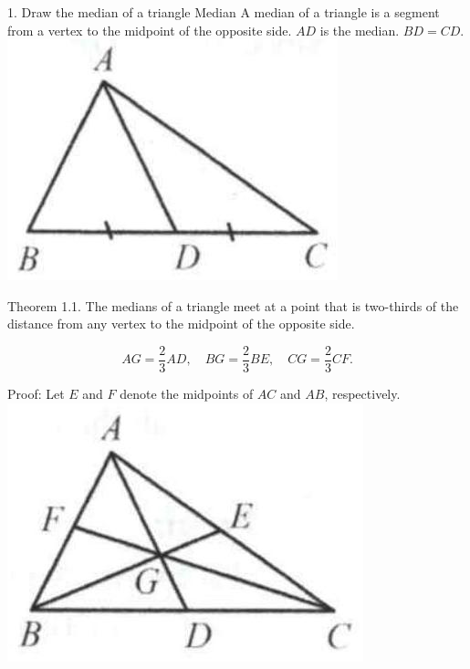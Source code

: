 \documentclass[10pt]{article}
\begin{document}
1. Draw the median of a triangle
Median
A median of a triangle is a segment from a vertex to the midpoint of the opposite side. \(A D\) is the median. \(B D=C D\).\\
\includegraphics[max width=\textwidth, center]{2025_04_17_97bc1f7e44d93c271a88g-007(1)}

Theorem 1.1. The medians of a triangle meet at a point that is two-thirds of the distance from any vertex to the midpoint of the opposite side.

\[
A G=\frac{2}{3} A D, \quad B G=\frac{2}{3} B E, \quad C G=\frac{2}{3} C F .
\]

Proof:
Let \(E\) and \(F\) denote the midpoints of \(A C\) and \(A B\), respectively.\\
\includegraphics[max width=\textwidth, center]{2025_04_17_97bc1f7e44d93c271a88g-007(2)}
\end{document}
